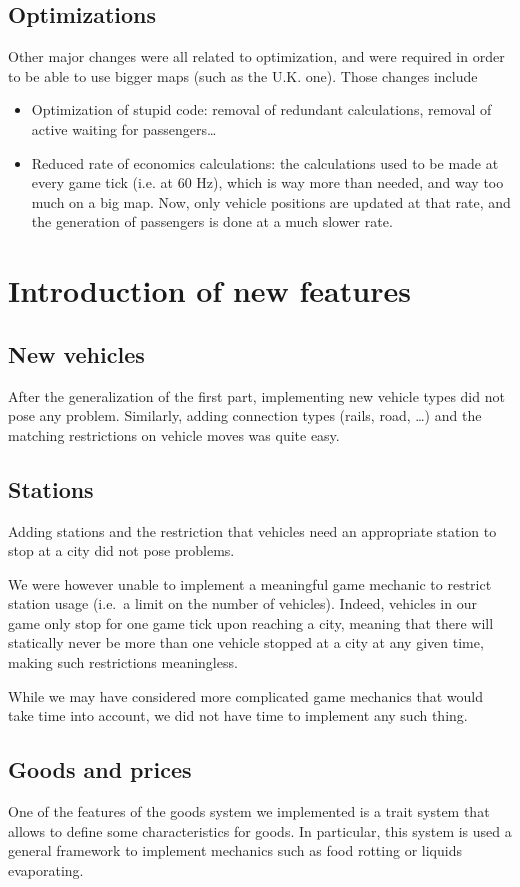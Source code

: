 \documentclass{article}
\begin{document}
\subsection{Optimizations}
Other major changes were all related to optimization, and were required in order to be able to use
bigger maps (such as the U.K. one). Those changes include
\begin{itemize}
\item Optimization of stupid code: removal of redundant calculations, removal of active waiting for passengers\dots
\item Reduced rate of economics calculations: the calculations used to be made at every game tick (i.e. at 60 Hz),
which is way more than needed, and way too much on a big map.
Now, only vehicle positions are updated at that rate, and the generation of passengers is done at a much slower rate.
\end{itemize}


\section{Introduction of new features}
\subsection{New vehicles}
After the generalization of the first part, implementing new vehicle types did not pose any problem.
Similarly, adding connection types (rails, road, \dots) and the matching restrictions on vehicle moves was quite easy.

\subsection{Stations}
Adding stations and the restriction that vehicles need an appropriate station to stop at a city did not pose problems. 

We were however unable to implement a meaningful game mechanic to restrict station usage (i.e.\ a limit on the number of vehicles).
Indeed, vehicles in our game only stop for one game tick upon reaching a city, meaning that there
will statically never be more than one vehicle stopped at a city at any given time, making such restrictions meaningless.

While we may have considered more complicated game mechanics that would take time into account,
we did not have time to implement any such thing. 

\subsection{Goods and prices}
One of the features of the goods system we implemented is a trait system that allows to define some characteristics
for goods. In particular, this system is used a general framework to implement mechanics such as food rotting or liquids evaporating.
\end{document}
